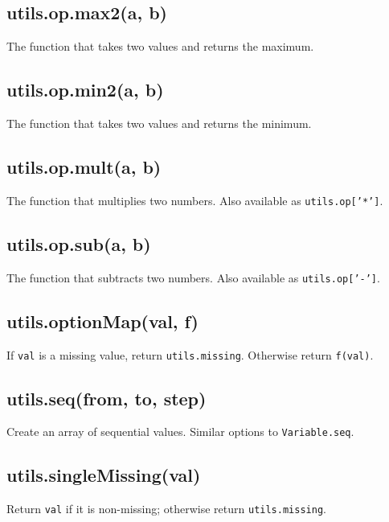 \documentclass{article}
\begin{document}
    \subsection*{utils.op.max2(a, b)}
    The function that takes two values and returns the maximum.


    \subsection*{utils.op.min2(a, b)}
    The function that takes two values and returns the minimum.


    \subsection*{utils.op.mult(a, b)}
    The function that multiplies two numbers. Also available as \texttt{utils.op['*']}.


    \subsection*{utils.op.sub(a, b)}
    The function that subtracts two numbers. Also available as \texttt{utils.op['-']}.


    \subsection*{utils.optionMap(val, f)}
    If \texttt{val} is a missing value, return \texttt{utils.missing}. Otherwise return \texttt{f(val)}.


    \subsection*{utils.seq(from, to, step)}
    Create an array of sequential values. Similar options to \texttt{Variable.seq}.


    \subsection*{utils.singleMissing(val)}
    Return \texttt{val} if it is non-missing; otherwise return \texttt{utils.missing}.
\end{document}
